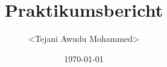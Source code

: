 \documentclass[a4paper,10pt]{article}
\begin{document}
\title{Praktikumsbericht}
\author{<Tejani Awudu Mohammed>}
\date{\today}
\maketitle

\tableofcontents
\clearpage








\end{document}
